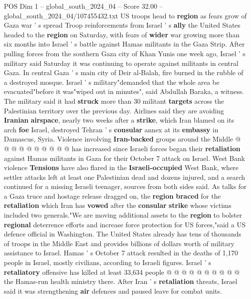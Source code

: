 \begin{textsample}{POS Dim 1 – global\_south\_2024\_04 – Score 32.00 – global\_south\_2024\_04/107455432.txt}  \label{ex:f1_pos_041}
US troops head to \textbf{region} as fears grow of Gaza war ' s spread Troop reinforcements from Israel ' s \textbf{ally} the United States headed to the \textbf{region} on Saturday, with fears of \textbf{wider} war growing more than six months into Israel ' s battle against Hamas militants in the Gaza Strip.
After pulling forces from the southern Gaza city of Khan Yunis one week ago, Israel ' s military said Saturday it was continuing to operate against militants in central Gaza.
In central Gaza ' s main city of Deir al-Balah, fire burned in the rubble of a destroyed mosque.
Israel ' s military"demanded that the whole area be evacuated"before it was"wiped out in minutes", said Abdullah Baraka, a witness.
The military said it had \textbf{struck} more than 30 militant \textbf{targets} across the Palestinian territory over the previous day.
Airlines said they are avoiding \textbf{Iranian} \textbf{airspace}, nearly two weeks after a \textbf{strike}, which Iran blamed on its arch \textbf{foe} Israel, destroyed Tehran ' s \textbf{consular} annex at its \textbf{embassy} in Damascus, Syria.
Violence involving \textbf{Iran-backed} groups around the Middle @ @ @ @ @ @ @ @ @ @ has increased since Israeli forces began their \textbf{retaliation} against Hamas militants in Gaza for their October 7 attack on Israel.
West Bank violence \textbf{Tensions} have also flared in the \textbf{Israeli-occupied} West Bank, where settler attacks left at least one Palestinian dead and dozens injured, and a search continued for a missing Israeli teenager, sources from both sides said.
As talks for a Gaza truce and hostage release dragged on, the \textbf{region} \textbf{braced} for the \textbf{retaliation} which Iran has \textbf{vowed} after the \textbf{consular} \textbf{strike} whose victims included two generals."We are moving additional assets to the \textbf{region} to bolster \textbf{regional} deterrence efforts and increase force protection for US forces,"said a US defence official in Washington.
The United States already has tens of thousands of troops in the Middle East and provides billions of dollars worth of military assistance to Israel.
Hamas ' s October 7 attack resulted in the deaths of 1,170 people in Israel, mostly civilians, according to Israeli figures.
Israel ' s \textbf{retaliatory} offensive has killed at least 33,634 people @ @ @ @ @ @ @ @ @ @ the Hamas-run health ministry there.
After Iran ' s \textbf{retaliation} threats, Israel said it was strengthening \textbf{air} defences and paused leave for combat units.

\end{textsample}
